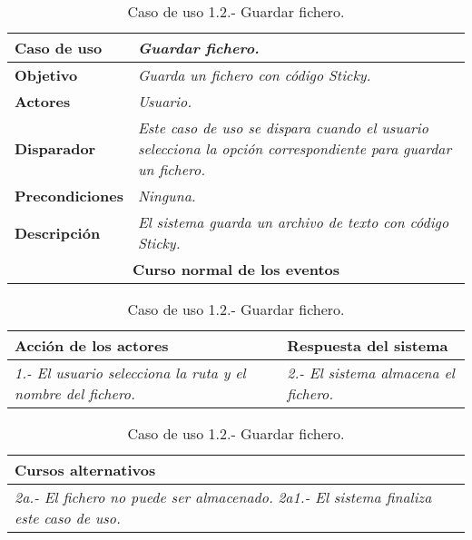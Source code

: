    \begin{table}[!ht] %
      \centering
      \begin{tabular}{|p{4cm}|p{11.5cm}|}\hline
      \textbf{Caso de uso} & \textit{Guardar fichero.}\\ \hline
      \textbf{Objetivo} & \textit{Guarda un fichero con código Sticky.}\\ \hline
      \textbf{Actores} & \textit{Usuario.}\\ \hline
      \textbf{Disparador} & \textit{Este caso de uso se dispara cuando el usuario selecciona la opción correspondiente para guardar
                              un fichero.}\\ \hline
      \textbf{Precondiciones} & \textit{Ninguna.}\\ \hline
      \textbf{Descripción} & \textit{El sistema guarda un archivo de texto con código Sticky.}\\ \hline 
      \multicolumn{2}{|c|}{\textbf{Curso normal de los eventos}}\\ \hline
    \end{tabular}
    \begin{tabular}{|p{7.75cm}|p{7.75cm}|}
      \hspace{2cm}\textbf{Acción de los actores} & \hspace{1.75cm}\textbf{Respuesta del sistema}\\ \hline
      \textit{1.- El usuario selecciona la ruta y el nombre del fichero.} & \textit{2.- El sistema almacena el fichero.} \\ \hline
    \end{tabular}
    \begin{tabular}{|p{15.9cm}|}
      \hspace{6cm}\textbf{Cursos alternativos}\\ \hline
      \textit{2a.- El fichero no puede ser almacenado.}
      \textit{  2a1.- El sistema finaliza este caso de uso.} \\ \hline
    \end{tabular}
    \caption{Caso de uso 1.2.- Guardar fichero.}
   \end{table}


